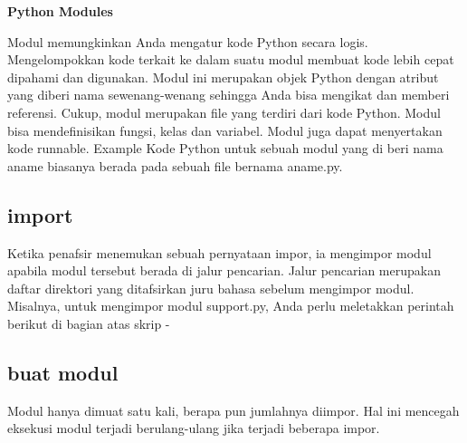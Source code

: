 
\sloppy
\begin{center}{\fontsize{16pt}{16pt}\selectfont \textbf{Python Modules} \\}\end{center}
Modul memungkinkan Anda mengatur kode Python secara logis. Mengelompokkan kode terkait ke dalam suatu modul membuat kode lebih cepat dipahami dan digunakan. Modul ini merupakan objek Python dengan atribut yang diberi nama sewenang-wenang sehingga Anda bisa mengikat dan memberi referensi.
Cukup, modul merupakan file yang terdiri dari kode Python. Modul bisa mendefinisikan fungsi, kelas dan variabel. Modul juga dapat menyertakan kode runnable.
Example
Kode Python untuk sebuah modul yang di beri nama aname biasanya berada pada sebuah file bernama aname.py. 

\subsection{import}
Ketika penafsir menemukan sebuah pernyataan impor, ia mengimpor modul apabila modul tersebut berada di jalur pencarian. Jalur pencarian merupakan daftar direktori yang ditafsirkan juru bahasa sebelum mengimpor modul. Misalnya, untuk mengimpor modul support.py, Anda perlu meletakkan perintah berikut di bagian atas skrip - 
 
\subsection{buat modul}Modul hanya dimuat satu kali, berapa pun jumlahnya diimpor. Hal ini mencegah eksekusi modul terjadi berulang-ulang jika terjadi beberapa impor.
 


